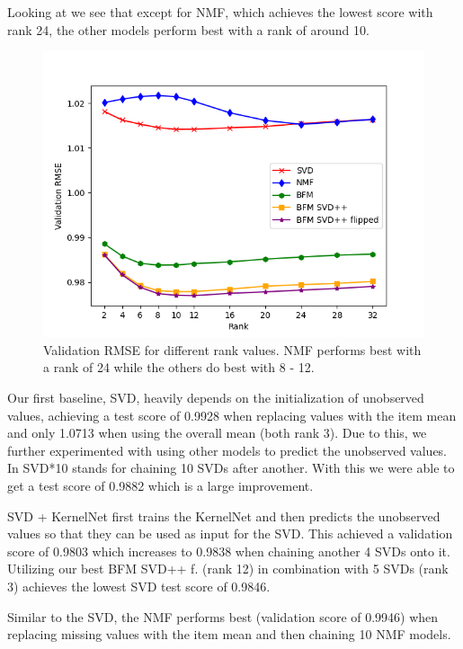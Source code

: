 \documentclass[10pt,conference,compsocconf]{IEEEtran}
\begin{document}
    Looking at  we see that except for NMF, which achieves the lowest score with rank 24, the other models perform best with a rank of around 10.
    \begin{figure}
        \includegraphics[width=\columnwidth]{figures/rank.png}
        \caption{Validation RMSE for different rank values.
        NMF performs best with a rank of 24 while the others do best with 8 - 12.}
        \label{fig:rank}
    \end{figure}


    Our first baseline, SVD, heavily depends on the initialization of unobserved values, achieving a test score of 0.9928 when replacing values with the item mean and only 1.0713 when using the overall mean (both rank 3).
    Due to this, we further experimented with using other models to predict the unobserved values.
    In  SVD*10 stands for chaining 10 SVDs after another.
    With this we were able to get a test score of 0.9882 which is a large improvement.

    SVD + KernelNet first trains the KernelNet and then predicts the unobserved values so that they can be used as input for the SVD.
    This achieved a validation score of 0.9803 which increases to 0.9838 when chaining another 4 SVDs onto it.
    Utilizing our best BFM SVD++ f. (rank 12) in combination with 5 SVDs (rank 3) achieves the lowest SVD test score of 0.9846.

    Similar to the SVD, the NMF performs best (validation score of 0.9946) when replacing missing values with the item mean and then chaining 10 NMF models.
\end{document}
